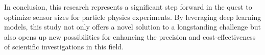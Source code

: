 \documentclass[conference]{IEEEtran}
\begin{document}
In conclusion, this research represents a significant step forward in the quest to optimize sensor sizes for particle physics experiments. By leveraging deep learning models, this study not only offers a novel solution to a longstanding challenge but also opens up new possibilities for enhancing the precision and cost-effectiveness of scientific investigations in this field.

\vspace{12pt}





\end{document}
